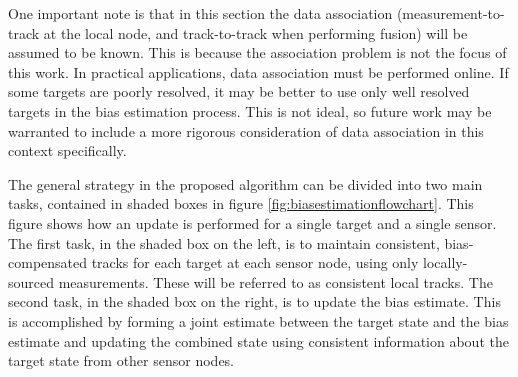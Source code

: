 \documentclass[journal]{IEEEtran}
\begin{document}
One important note is that in this section the data association (measurement-to-track at the local node, and track-to-track when performing fusion) will be assumed to be known. This is because the association problem is not the focus of this work. In practical applications, data association must be performed online. If some targets are poorly resolved, it may be better to use only well resolved targets in the bias estimation process. This is not ideal, so future work may be warranted to include a more rigorous consideration of data association in this context specifically.

The general strategy in the proposed algorithm can be divided into two main tasks, contained in shaded boxes in figure \ref{fig:biasestimationflowchart}. This figure  shows how an update is performed for a single target and a single sensor. The first task, in the shaded box on the left, is to maintain consistent, bias-compensated tracks for each target at each sensor node, using only locally-sourced measurements. These will be referred to as consistent local tracks. The second task, in the shaded box on the right, is to update the bias estimate. This is accomplished by forming a joint estimate between the target state and the bias estimate and updating the combined state using consistent information about the target state from other sensor nodes.
\end{document}
